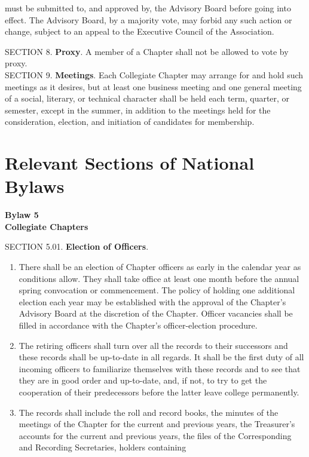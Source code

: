 \begin{optionalpart}
\begin{enumerate}
must be submitted to, and approved by, the Advisory Board before going into effect. The 
Advisory Board, by a majority vote, may forbid any such action or change, subject to an 
appeal to the Executive Council of the Association.
\end{enumerate}
SECTION 8. {\bf Proxy}. A member of a Chapter shall not be allowed to vote by proxy.\\[1em]
SECTION 9. {\bf Meetings}. Each Collegiate Chapter may arrange for and hold such meetings as it desires, but at least one business meeting and one general meeting of a social, 
literary, or technical character shall be held each term, quarter, or semester, except in the 
summer, in addition to the meetings held for the consideration, election, and initiation of 
candidates for membership.\\[1em]
\part{Relevant Sections of National Bylaws}
\setcounter{chapter}{5}
\setcounter{section}{3}
\begin{center}
{\bf Bylaw 5\\
Collegiate Chapters}
\end{center}
SECTION 5.01. {\bf  Election of Officers}.
\begin{enumerate}
\item There shall be an election of Chapter officers as early 
in the calendar year as conditions allow. They shall take office at least one month before the annual 
spring convocation or commencement. The policy of holding one additional election each year may 
be established with the approval of the Chapter's Advisory Board at the discretion of the Chapter. 
Officer vacancies shall be filled in accordance with the Chapter's officer-election procedure.
\item The retiring officers shall turn over all the records to their successors and these records 
shall be up-to-date in all regards. It shall be the first duty of all incoming officers to familiarize 
themselves with these records and to see that they are in good order and up-to-date, and, if not, 
to try to get the cooperation of their predecessors before the latter leave college permanently.
\item The records shall include the roll and record books, the minutes of the meetings of 
the Chapter for the current and previous years, the Treasurer's accounts for the current and 
previous years, the files of the Corresponding and Recording Secretaries, holders containing 

\end{enumerate}
\end{optionalpart}
